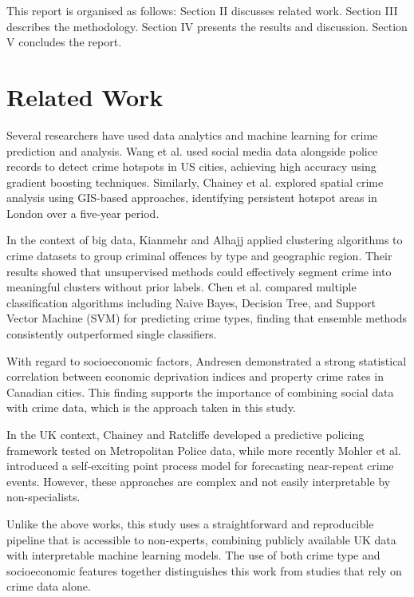 \documentclass[conference]{IEEEtran}
\begin{document}
This report is organised as follows: Section II discusses related work. Section III describes the methodology. Section IV presents the results and discussion. Section V concludes the report.

\section{Related Work}

Several researchers have used data analytics and machine learning for crime prediction and analysis. Wang et al. \cite{b4} used social media data alongside police records to detect crime hotspots in US cities, achieving high accuracy using gradient boosting techniques. Similarly, Chainey et al. \cite{b5} explored spatial crime analysis using GIS-based approaches, identifying persistent hotspot areas in London over a five-year period.

In the context of big data, Kianmehr and Alhajj \cite{b6} applied clustering algorithms to crime datasets to group criminal offences by type and geographic region. Their results showed that unsupervised methods could effectively segment crime into meaningful clusters without prior labels. Chen et al. \cite{b7} compared multiple classification algorithms including Naive Bayes, Decision Tree, and Support Vector Machine (SVM) for predicting crime types, finding that ensemble methods consistently outperformed single classifiers.

With regard to socioeconomic factors, Andresen \cite{b8} demonstrated a strong statistical correlation between economic deprivation indices and property crime rates in Canadian cities. This finding supports the importance of combining social data with crime data, which is the approach taken in this study.

In the UK context, Chainey and Ratcliffe \cite{b9} developed a predictive policing framework tested on Metropolitan Police data, while more recently Mohler et al. \cite{b10} introduced a self-exciting point process model for forecasting near-repeat crime events. However, these approaches are complex and not easily interpretable by non-specialists.

Unlike the above works, this study uses a straightforward and reproducible pipeline that is accessible to non-experts, combining publicly available UK data with interpretable machine learning models. The use of both crime type and socioeconomic features together distinguishes this work from studies that rely on crime data alone.
\end{document}
